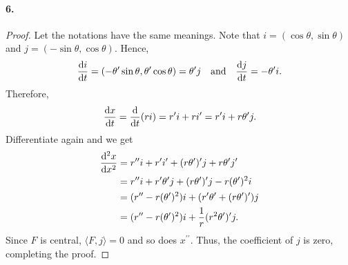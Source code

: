\paragraph{6.}
\begin{proof}
  Let the notations have the same meanings. Note that $i=(\cos\theta,\sin
  \theta)$ and $j=(-\sin\theta,\cos\theta)$. Hence,
  \[
    \frac{\mathrm{d} i}{\mathrm{d} t} = (-\theta^\prime\sin\theta, \theta^\prime\cos\theta) 
    = \theta^\prime j
    \quad\text{and}\quad
    \frac{\mathrm{d} j}{\mathrm{d} t} = -\theta^\prime i.
  \]
  Therefore,
  \[
    \frac{\mathrm{d} x}{\mathrm{d} t} = \frac{\mathrm{d}}{\mathrm{d} t}(ri) = r^\prime i + r i^\prime
    = r^\prime i + r\theta^\prime j.  
  \]
  Differentiate again and we get
  \begin{align*}
    \frac{\mathrm{d}^2 x}{\mathrm{d} x^2} 
    &= r^{\prime\prime}i + r^\prime i^\prime + (r\theta^\prime)^\prime j + r\theta^\prime j^\prime \\
    &= r^{\prime\prime}i+r^\prime\theta^\prime j + (r\theta^\prime)^\prime j-r(\theta^\prime)^2i\\
    &= (r^{\prime\prime}-r(\theta^\prime)^2)i + (r^\prime\theta^\prime+(r\theta^\prime)^\prime)j \\
    &= (r^{\prime\prime}-r(\theta^\prime)^2)i + \frac{1}{r}(r^2\theta^\prime)^\prime j.
  \end{align*}
  Since $F$ is central, $\langle F, j\rangle=0$ and so does $x^{\prime\prime}$.
  Thus, the coefficient of $j$ is zero, completing the proof.
\end{proof}
